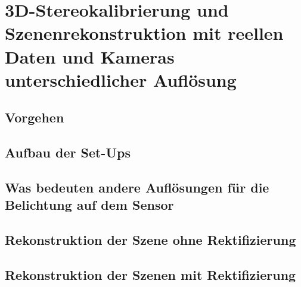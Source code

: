 \chapter{3D-Stereokalibrierung und Szenenrekonstruktion mit reellen Daten und Kameras unterschiedlicher Auflösung}

\section{Vorgehen}
\section{Aufbau der Set-Ups}
\section{Was bedeuten andere Auflösungen für die Belichtung auf dem Sensor}
\section{Rekonstruktion der Szene ohne Rektifizierung}
\section{Rekonstruktion der Szenen mit Rektifizierung}



